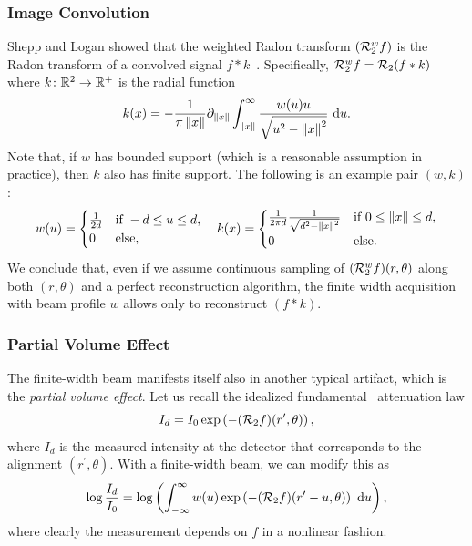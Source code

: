 \documentclass[../ml-ct.tex]{subfiles}
\begin{document}
\subsubsection{Image Convolution}
Shepp and Logan showed that the weighted Radon transform \( (\mathcal{R}_2^w f) \) is the Radon transform of a convolved signal \( f * k \)~\cite{shepp_fourier_1974}.
Specifically, \( \mathcal{R}_2^w f = \mathcal{R}_2 (f * k) \) where \( k\colon\mathbb{R}^2\to\mathbb{R}^+ \) is the radial function
\begin{equation}
	k(x) = -\frac{1}{\pi\left\lVert x\right\rVert} \partial_{\left\lVert x\right\rVert} \int_{\left\lVert x\right\rVert}^\infty \frac{w(u)u}{\sqrt{u^2 - \left\lVert x\right\rVert^2}}\ \mathrm{d} u.
\end{equation}
Note that, if \( w \) has bounded support (which is a reasonable assumption in practice), then \( k \) also has finite support.
The following is an example pair \( (w, k) \):
\begin{equation}
	w(u) = \begin{cases}
		\frac{1}{2d} & \text{if}\ -d \leq u \leq d, \\
		0 & \text{else},
	\end{cases}\quad
	k(x) = \begin{cases}
		\frac{1}{2\pi d}\frac{1}{\sqrt{d^2 - \left\lVert x\right\rVert^2}} & \text{if}\ 0 \leq \left\lVert x\right\rVert \leq d, \\
		0 & \text{else}.
	\end{cases}
\end{equation}
We conclude that, even if we assume continuous sampling of \( (\mathcal{R}_2^w f)(r, \theta) \) along both \( (r, \theta) \) and a perfect reconstruction algorithm, the finite width acquisition with beam profile \( w \) allows only to reconstruct \( (f * k) \).
\subsubsection{Partial Volume Effect}
The finite-width beam manifests itself also in another typical artifact, which is the \emph{partial volume effect}.
Let us recall the idealized fundamental \xray\ attenuation law
\begin{equation}
	I_{d} = I_0 \exp \left( -(\mathcal{R}_2 f)(r^\prime, \theta) \right),
\end{equation}
where \( I_{d} \) is the measured intensity at the detector that corresponds to the alignment \( (r^\prime, \theta) \).
With a finite-width beam, we can modify this as
\begin{equation}
	\log \frac{I_{d}}{I_0} = \log \left( \int_{-\infty}^{\infty} w(u) \exp \left( -(\Radon f)(r^\prime - u, \theta) \right)\ \dd u \right),%
	\label{eq:image:nonlinear}
\end{equation}
where clearly the measurement depends on \( f \) in a nonlinear fashion.
\end{document}
